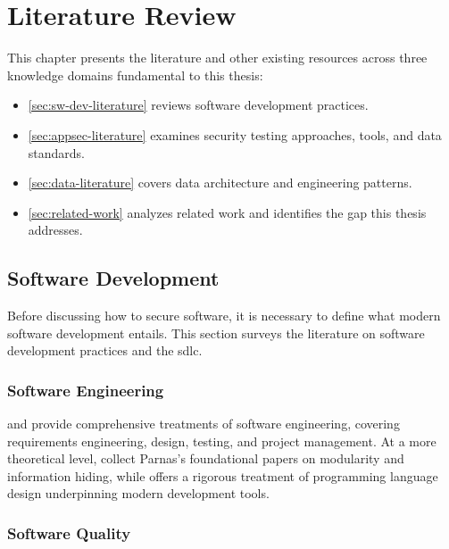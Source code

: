 \chapter{Literature Review}
\label{ch:literature-review}

This chapter presents the literature and other existing resources across three knowledge domains fundamental to this thesis:
\begin{itemize}
    \item \autoref{sec:sw-dev-literature} reviews software development practices.
    \item \autoref{sec:appsec-literature} examines security testing approaches, tools, and data standards.
    \item \autoref{sec:data-literature} covers data architecture and engineering patterns.
    \item \autoref{sec:related-work} analyzes related work and identifies the gap this thesis addresses.
\end{itemize}


\section{Software Development}
\label{sec:sw-dev-literature}

Before discussing how to secure software, it is necessary to define what modern software development entails. This section surveys the literature on software development practices and the \gls{sdlc}.


\subsection{Software Engineering}

\textcite{Sommerville2015} and \textcite{Pressman2019} provide comprehensive treatments of software engineering, covering requirements engineering, design, testing, and project management. At a more theoretical level, \textcite{Hoffman2001} collect Parnas's foundational papers on modularity and information hiding, while \textcite{Scott2015} offers a rigorous treatment of programming language design underpinning modern development tools.


\subsection{Software Quality}


